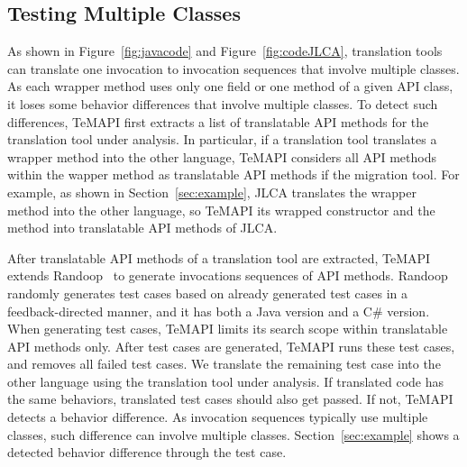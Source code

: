 \subsection{Testing Multiple Classes}
\label{sec:approach:sequence}
As shown in Figure~\ref{fig:javacode} and Figure~\ref{fig:codeJLCA}, translation tools can translate one invocation to invocation sequences that involve multiple classes. As each wrapper method uses only one field or one method of a given API class, it loses some behavior differences that involve multiple classes. To detect such differences, TeMAPI first extracts a list of translatable API methods for the translation tool under analysis. In particular, if a translation tool translates a wrapper method into the other language, TeMAPI considers all API methods within the wapper method as translatable API methods if the migration tool. For example, as shown in Section~\ref{sec:example}, JLCA translates the  wrapper method into the other language, so TeMAPI its wrapped  constructor and the  method into translatable API methods of JLCA.

After translatable API methods of a translation tool are extracted, TeMAPI extends Randoop~\cite{pacheco2007feedback} to generate invocations sequences of API methods. Randoop randomly generates test cases based on already generated test cases in a feedback-directed manner, and it has both a Java version and a C\# version. When generating test cases, TeMAPI limits its search scope within translatable API methods only. After test cases are generated, TeMAPI runs these test cases, and removes all failed test cases. We translate the remaining test case into the other language using the translation tool under analysis. If translated code has the same behaviors, translated test cases should also get passed. If not, TeMAPI detects a behavior difference. As invocation sequences typically use multiple classes, such difference can involve multiple classes. Section~\ref{sec:example} shows a detected behavior difference through the  test case.




